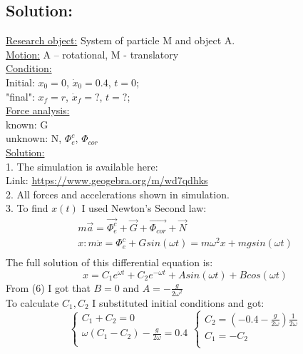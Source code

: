 \documentclass[a4paper,11pt,oneside,article]{memoir}
\begin{document}
\subsection{Solution:}
\underline{Research object:} System of particle M and object A. \\
\underline{Motion:} A – rotational, M - translatory\\
\underline{Condition:}\\
Initial: $x_0 = 0$, $\dot x_0 = 0.4$, $t=0$;\\
"final": $x_f = r$, $\dot x_f = ?$, $t=?$;\\
\underline{Force analysis:}\\
known: G\\
unknown: N, $\Phi^c_e$,  $\Phi_{cor}$\\
\underline{Solution:}\\
1. The simulation is available here:\\
Link: \url{https://www.geogebra.org/m/wd7qdhks}\\
2. All forces and accelerations shown in simulation.\\
3. To find $x(t)$ I used Newton's Second law:
\begin{equation}
    \begin{split}
        m\Vec{a} = \Vec{\Phi^c_e} + \Vec{G} + \Vec{\Phi_{cor}} + \Vec{N}\\
        x: m\ddot x = \Phi^c_e + Gsin(\omega t) = m\omega^2x+mgsin(\omega t)\\
    \end{split}
\end{equation}
The full solution of this differential equation is:
\begin{equation}
    x = C_1 e^{\omega t} +  C_2 e^{-\omega t} + A sin(\omega t)+ B cos(\omega t)
\end{equation}
From (6) I got that $B=0$ and $A = -\frac{g}{2\omega^2}$\\
To calculate $C_1, C_2$ I substituted initial conditions and got:\\
\begin{equation}
\begin{cases}
        C_1 + C_2 = 0\\
        \omega(C_1-C_2)- \frac{g}{2\omega} = 0.4\\
\end{cases}
\begin{cases}
        C_2 = (-0.4 - \frac{g}{2\omega})\frac{1}{2\omega}\\
        C_1 = -C_2\\
\end{cases}
\end{equation}
\end{document}
